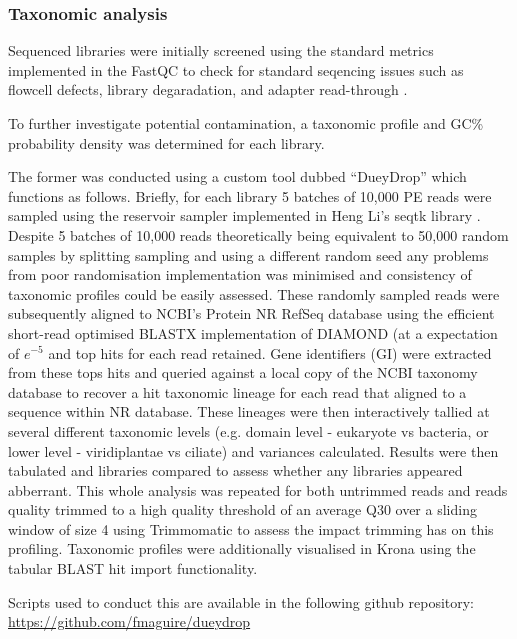 \subsubsection{Taxonomic analysis}
Sequenced libraries were initially screened using the standard
metrics implemented in the FastQC to check for standard seqencing issues
such as flowcell defects, library degaradation, and adapter read-through \citep{fastqc2015}.

To further investigate potential contamination, a taxonomic
profile and GC\% probability density was determined for each library.

The former was conducted using a custom tool dubbed ``DueyDrop'' which functions as follows.
Briefly, for each library 5 batches of 10,000 PE reads were sampled 
using the reservoir sampler \citep{Vitter1985} implemented in Heng Li's seqtk library \citep{SeqtkGitHub}.
Despite 5 batches of 10,000 reads theoretically being equivalent to 50,000 random samples by splitting
sampling and using a different random seed any problems from poor randomisation implementation 
was minimised and consistency of taxonomic profiles could be easily assessed.
These randomly sampled reads were subsequently aligned to NCBI's Protein NR RefSeq database \citep{Pruitt2007}
using the efficient short-read optimised BLASTX implementation of DIAMOND \citep{Buchfink2015} (at a expectation
    of \(e^{-5}\) and top hits for each read retained.  Gene identifiers (GI) were extracted from these tops hits and queried against a
local copy of the NCBI taxonomy database \citep{Federhen2012} to recover a hit taxonomic lineage for each
read that aligned to a sequence within NR database. These lineages were then interactively tallied 
at several different taxonomic levels (e.g. domain level - eukaryote vs bacteria, or lower level - viridiplantae vs ciliate) and variances
calculated.  Results were then tabulated and libraries compared to assess whether any libraries appeared
abberrant.  This whole analysis was repeated for both untrimmed reads and reads quality trimmed
to a high quality threshold of an average Q30 over a sliding window of size 4 using
Trimmomatic \citep{Bolger2014a} to assess the impact trimming has on this profiling.
Taxonomic profiles were additionally visualised in Krona \citep{Ondov2011} using
the tabular BLAST hit import functionality.

Scripts used to conduct this are available in the following github repository:\\
\url{https://github.com/fmaguire/dueydrop}

